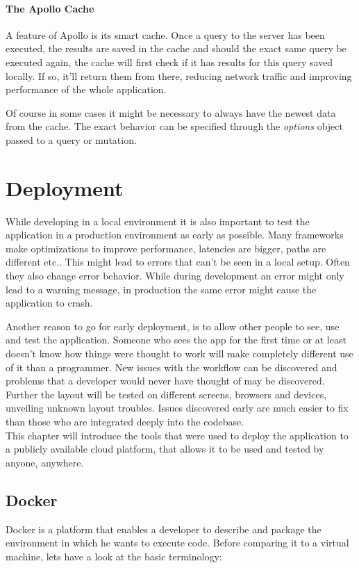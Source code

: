 \subsubsection{The Apollo Cache}
A feature of Apollo is its smart cache. Once a query to the server has been executed, the results are saved in the cache and should the exact same query be executed again, the cache will first check if it has results for this query saved locally. If so, it'll return them from there, reducing network traffic and improving performance of the whole application. 

Of course in some cases it might be necessary to always have the newest data from the cache. The exact behavior can be specified through the \emph{options} object passed to a query or mutation.

\chapter{Deployment}

While developing in a local environment it is also important to test the application in a production environment as early as possible. Many frameworks make optimizations to improve performance, latencies are bigger, paths are different etc.. This might lead to errors that can't be seen in a local setup. Often they also change error behavior. While during development an error might only lead to a warning message, in production the same error might cause the application to crash.

Another reason to go for early deployment, is to allow other people to see, use and test the application. Someone who sees the app for the first time or at least doesn't know how things were thought to work will make completely different use of it than a programmer. New issues with the workflow can be discovered and problems that a developer would never have thought of may be discovered. Further the layout will be tested on different screens, browsers and devices, unveiling unknown layout troubles. Issues discovered early are much easier to fix than those who are integrated deeply into the codebase. \\

This chapter will introduce the tools that were used to deploy the application to a publicly available cloud platform, that allows it to be used and tested by anyone, anywhere.

\section{Docker}
Docker is a platform that enables a developer to describe and package the environment in which he wants to execute code.
Before comparing it to a virtual machine, lets have a look at the basic terminology:

